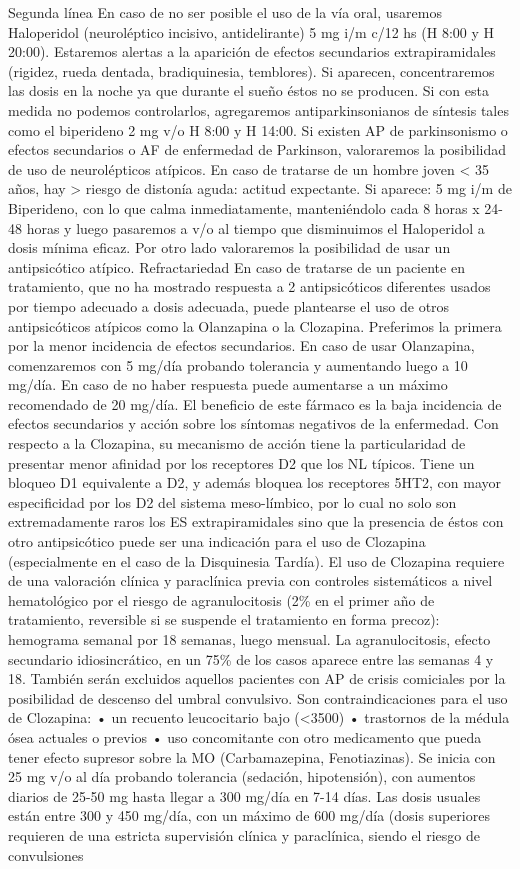 \documentclass{scrbook}
\begin{document}
Segunda línea En caso de no ser posible el uso de la vía oral, usaremos Haloperidol (neuroléptico incisivo, antidelirante) 5 mg i/m c/12 hs (H 8:00 y H 20:00). Estaremos alertas a la aparición de efectos secundarios extrapiramidales (rigidez, rueda dentada, bradiquinesia, temblores). Si aparecen, concentraremos las dosis en la noche ya que durante el sueño éstos no se producen. Si con esta medida no podemos controlarlos, agregaremos antiparkinsonianos de síntesis tales como el biperideno 2 mg v/o H 8:00 y H 14:00. Si existen AP de parkinsonismo o efectos secundarios o AF de enfermedad de Parkinson, valoraremos la posibilidad de uso de neurolépticos atípicos. En caso de tratarse de un hombre joven < 35 años, hay > riesgo de distonía aguda: actitud expectante. Si aparece: 5 mg i/m de Biperideno, con lo que calma inmediatamente, manteniéndolo cada 8 horas x 24-48 horas y luego pasaremos a v/o al tiempo que disminuimos el Haloperidol a dosis mínima eficaz. Por otro lado valoraremos la posibilidad de usar un antipsicótico atípico. Refractariedad En caso de tratarse de un paciente en tratamiento, que no ha mostrado respuesta a 2 antipsicóticos diferentes usados por tiempo adecuado a dosis adecuada, puede plantearse el uso de otros antipsicóticos atípicos como la Olanzapina o la Clozapina. Preferimos la primera por la menor incidencia de efectos secundarios. En caso de usar Olanzapina, comenzaremos con 5 mg/día probando tolerancia y aumentando luego a 10 mg/día. En caso de no haber respuesta puede aumentarse a un máximo recomendado de 20 mg/día. El beneficio de este fármaco es la baja incidencia de efectos secundarios y acción sobre los síntomas negativos de la enfermedad. Con respecto a la Clozapina, su mecanismo de acción tiene la particularidad de presentar menor afinidad por los receptores D2 que los NL típicos. Tiene un bloqueo D1 equivalente a D2, y además bloquea los receptores 5HT2, con mayor especificidad por los D2 del sistema meso-límbico, por lo cual no solo son extremadamente raros los ES extrapiramidales sino que la presencia de éstos con otro antipsicótico puede ser una indicación para el uso de Clozapina (especialmente en el caso de la Disquinesia Tardía). El uso de Clozapina requiere de una valoración clínica y paraclínica previa con controles sistemáticos a nivel hematológico por el riesgo de agranulocitosis (2\% en el primer año de tratamiento, reversible si se suspende el tratamiento en forma precoz): hemograma semanal por 18 semanas, luego mensual. La agranulocitosis, efecto secundario idiosincrático, en un 75\% de los casos aparece entre las semanas 4 y 18. También serán excluidos aquellos pacientes con AP de crisis comiciales por la posibilidad de descenso del umbral convulsivo. Son contraindicaciones para el uso de Clozapina: • un recuento leucocitario bajo (<3500) • trastornos de la médula ósea actuales o previos • uso concomitante con otro medicamento que pueda tener efecto supresor sobre la MO (Carbamazepina, Fenotiazinas). Se inicia con 25 mg v/o al día probando tolerancia (sedación, hipotensión), con aumentos diarios de 25-50 mg hasta llegar a 300 mg/día en 7-14 días. Las dosis usuales están entre 300 y 450 mg/día, con un máximo de 600 mg/día (dosis superiores requieren de una estricta supervisión clínica y paraclínica, siendo el riesgo de convulsiones 
\end{document}
